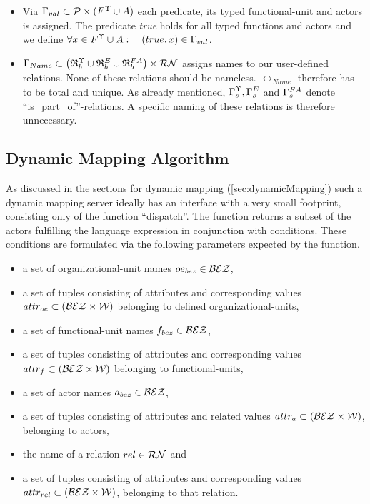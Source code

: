 \begin{itemize}
	\item Via $\Gamma_{val} \subset \mathcal{P} \times (F^{\Upsilon} \cup A)$ each predicate, its typed functional-unit and actors is assigned. The predicate {\em true} holds for all typed functions and actors and we define $\forall x \in F^{\Upsilon} \cup A: \quad (true, x) \in \Gamma_{val}$.

	\item $\rel_{Name} \subset \bigl( \typbenutzerrelationenmenge \cup \relmengebenutzerinstOE_F \cup \relmengebenutzerFA \bigr) \times \relname$
		assigns names to our user-defined relations. None of these relations should be nameless. $\rel_{Name}$ therefore has to be total and unique.
		As already mentioned, $\typstrukturrelation, \relstrukturOE_F$ and	${\Gamma}^{FA}_{s}$ denote ``is\_part\_of''-relations. A specific naming of these 		relations is therefore unnecessary.
\end{itemize}

\subsection{Dynamic Mapping Algorithm}\label{PolicyResolutionFormal}

As discussed in the sections for dynamic mapping (\ref{sec:dynamicMapping}) such a dynamic mapping server ideally has an interface with a very small footprint, consisting only of the function "`dispatch"'. The function returns a subset of the actors fulfilling the language expression in conjunction with conditions. These conditions are formulated via the following parameters expected by the function.

\begin{itemize}
	\item a set of organizational-unit names $oe_{bez} \in \mathcal{BEZ}$,
	\item a set of tuples consisting of attributes and corresponding values $attr_{oe} \subset (\mathcal{BEZ} \times \mathcal{W})$ belonging to defined organizational-units,
	\item a set of functional-unit names $f_{bez} \in \mathcal{BEZ}$,
	\item a set of tuples consisting of attributes and corresponding values $attr_{f} \subset (\mathcal{BEZ} \times \mathcal{W})$ belonging to functional-units,
	\item a set of actor names $a_{bez} \in \mathcal{BEZ}$,
	\item a set of tuples consisting of attributes and related values $attr_{a} \subset (\mathcal{BEZ} \times \mathcal{W})$, belonging to actors,
	\item the name of a relation $rel \in \mathcal{RN}$ and
	\item a set of tuples consisting of attributes and corresponding values $attr_{rel} \subset (\mathcal{BEZ} \times \mathcal{W})$, belonging to that relation.
\end{itemize}

